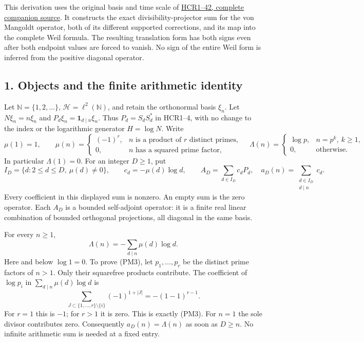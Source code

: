 \documentclass[
  10pt,
  a4paper,
]{article}
\begin{document}
This derivation uses the original basis and time scale of
\href{HURWITZ_CYCLOTOMIC_RECEIVER.tex}{HCR1--42, complete companion
source}. It constructs the exact divisibility-projector sum for the von
Mangoldt operator, both of its different supported corrections, and its
map into the complete Weil formula. The resulting translation form has
both signs even after both endpoint values are forced to vanish. No sign
of the entire Weil form is inferred from the positive diagonal operator.

\subsection{1. Objects and the finite arithmetic
identity}\label{objects-and-the-finite-arithmetic-identity}

Let \(\mathbb N=\{1,2,\ldots\}\), \(\mathcal H=\ell^2(\mathbb N)\), and
retain the orthonormal basis \(\xi_n\). Let \(N\xi_n=n\xi_n\) and
\(P_d\xi_n=\mathbf1_{d\mid n}\xi_n\). Thus \(P_d=S_dS_d^*\) in HCR1--4,
with no change to the index or the logarithmic generator \(H=\log N\).
Write \[
\mu(1)=1,\qquad
\mu(n)=\begin{cases}(-1)^r,&n\text{ is a product of }r\text{ distinct primes},\\0,&n\text{ has a squared prime factor},\end{cases}
\quad
\Lambda(n)=\begin{cases}\log p,&n=p^k,\ k\ge1,\\0,&\text{otherwise}.
\end{cases}
\tag{PM1}
\] In particular \(\Lambda(1)=0\). For an integer \(D\ge1\), put \[
I_D=\{d:2\le d\le D,\ \mu(d)\ne0\},\qquad
c_d=-\mu(d)\log d,\qquad
A_D=\sum_{d\in I_D}c_dP_d,
\quad a_D(n)=\sum_{\substack{d\in I_D\\d\mid n}}c_d.
\tag{PM2}
\] Every coefficient in this displayed sum is nonzero. An empty sum is
the zero operator. Each \(A_D\) is a bounded self-adjoint operator: it
is a finite real linear combination of bounded orthogonal projections,
all diagonal in the same basis.

For every \(n\ge1\), \[
\boxed{\Lambda(n)=-\sum_{d\mid n}\mu(d)\log d.}
\tag{PM3}
\] Here and below \(\log1=0\). To prove (PM3), let \(p_1,\ldots,p_r\) be
the distinct prime factors of \(n>1\). Only their squarefree products
contribute. The coefficient of \(\log p_i\) in
\(\sum_{d\mid n}\mu(d)\log d\) is \[
\sum_{J\subset\{1,\ldots,r\}\setminus\{i\}}(-1)^{1+|J|}
=-(1-1)^{r-1}.
\] For \(r=1\) this is \(-1\); for \(r>1\) it is zero. This is exactly
(PM3). For \(n=1\) the sole divisor contributes zero. Consequently
\(a_D(n)=\Lambda(n)\) as soon as \(D\ge n\). No infinite arithmetic sum
is needed at a fixed entry.
\end{document}
